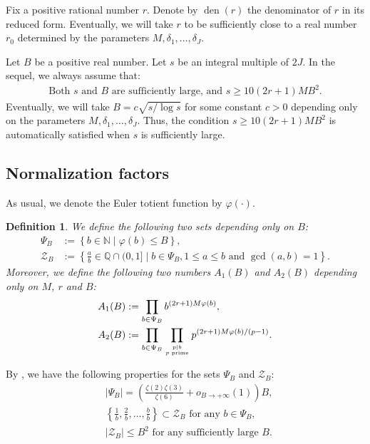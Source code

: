 \documentclass[12pt]{article}
\newtheorem{definition}[theorem]{Definition}
\numberwithin{equation}{section}
\begin{document}
Fix a positive rational number $r$. Denote by $\operatorname{den}(r)$ the denominator of $r$ in its reduced form. Eventually, we will take $r$ to be sufficiently close to a real number $r_0$ determined by the parameters $M,\delta_1,\ldots,\delta_J$.

Let $B$ be a positive real number. Let $s$ be an integral multiple of $2J$. In the sequel, we always assume that: 
\begin{align}
\text{Both $s$ and $B$ are sufficiently large, and~} s \geqslant 10(2r+1)MB^2. \label{cond_s_B}
\end{align}
Eventually, we will take $B = c\sqrt{s/\log s}$ for some constant $c>0$ depending only on the parameters $M,\delta_1,\ldots,\delta_J$. Thus, the condition $s \geqslant 10(2r+1)MB^2$ is automatically satisfied when $s$ is sufficiently large.

\subsection{Normalization factors}

As usual, we denote the Euler totient function by $\varphi(\cdot)$. 

\begin{definition}
We define the following two sets depending only on $B$:
\begin{align*}
	\Psi_B &:= \left\{ b \in \mathbb{N} \mid \varphi(b) \leqslant B \right\}, \\
	\mathcal{Z}_B &:= \left\{  \frac{a}{b} \in \mathbb{Q} \cap(0,1] \mid b \in \Psi_B, 1 \leqslant a \leqslant b \text{~and~} \gcd(a,b)=1  \right\}.
\end{align*}
Moreover, we define the following two numbers $A_1(B)$ and $A_2(B)$ depending only on $M$, $r$ and $B$:
\begin{align*}
	A_1(B) &:= \prod_{b \in \Psi_B} b^{(2r+1)M\varphi(b)}, \\
	A_2(B) &:= \prod_{b \in \Psi_B} \prod_{ p \mid b \atop p \text{~prime}} p^{(2r+1)M\varphi(b)/(p-1)}.
\end{align*}
\end{definition}

\medskip

By \cite[Prop. 2.2]{LY2020}, we have the following properties for the sets $\Psi_B$ and $\mathcal{Z}_B$:
\begin{align}
	& \left|\Psi_B\right|=\left(\frac{\zeta(2) \zeta(3)}{\zeta(6)}+o_{B \rightarrow+\infty}(1)\right) B, \label{est_Psi_B}\\
	& \left\{ \frac{1}{b}, \frac{2}{b}, \ldots, \frac{b}{b} \right\} \subset \mathcal{Z}_{B} \text{~for any~} b \in \Psi_B, \label{prop_Psi_B} \\
	& |\mathcal{Z}_B| \leqslant B^2 \text{~for any sufficiently large~} B. \label{est_Z_B}
\end{align}
\end{document}
